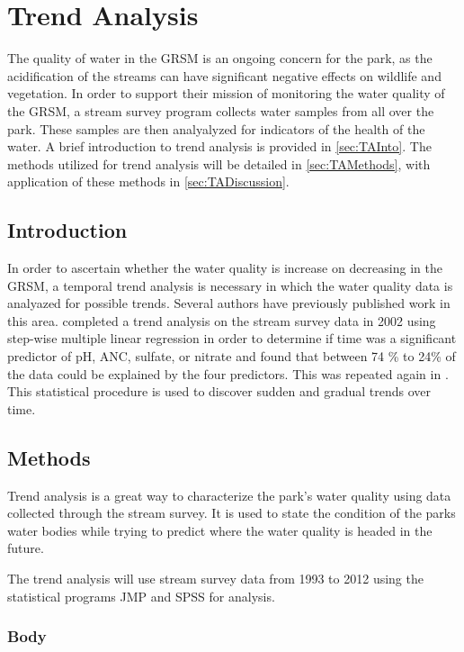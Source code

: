 \chapter{Trend Analysis}\label{ch:TA}
The quality of water in the GRSM is an ongoing concern for the park, as the acidification of the streams can have significant negative effects on wildlife and vegetation.
In order to support their mission of monitoring the water quality of the GRSM, a stream survey program collects water samples from all over the park.
These samples are then analyalyzed for indicators of the health of the water.
A brief introduction to trend analysis is provided in \autoref{sec:TAInto}.
The methods utilized for trend analysis will be detailed in \autoref{sec:TAMethods}, with application of these methods in \autoref{sec:TADiscussion}.

\section{Introduction}
\label{sec:TAIntro}

In order to ascertain whether the water quality is increase on decreasing in the GRSM, a temporal trend analysis is necessary in which the water quality data is analyazed for possible trends.
Several authors have previously published work in this area.
\citet{robinson2008ph} completed a trend analysis on the stream survey data in 2002 using step-wise multiple linear regression in order to determine if time was a significant predictor of pH, ANC, sulfate, or nitrate and found that between 74 \% to 24\% of the data could be explained by the four predictors.
This was repeated again in \citep{cai2012}. 
This statistical procedure is used to discover sudden and gradual trends over time. 

\section{Methods}
\label{sec:TAMethods}

Trend analysis is a great way to characterize the park's water quality using data collected through the stream survey.
It is used to state the condition of the parks water bodies while trying to predict where the water quality is headed in the future. 

The trend analysis will use stream survey data from 1993 to 2012 using the statistical programs JMP and SPSS for analysis.

\subsection{Body}


